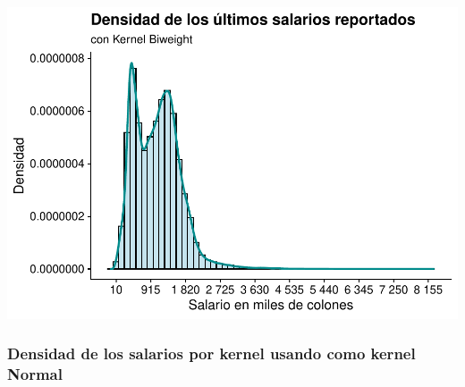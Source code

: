 \documentclass[
]{article}
\begin{document}
\includegraphics{mientras_files/figure-latex/unnamed-chunk-13-1.pdf}

\hypertarget{densidad-de-los-salarios-por-kernel-usando-como-kernel-normal}{%
\subsubsection{Densidad de los salarios por kernel usando como kernel
Normal}\label{densidad-de-los-salarios-por-kernel-usando-como-kernel-normal}}
\end{document}
